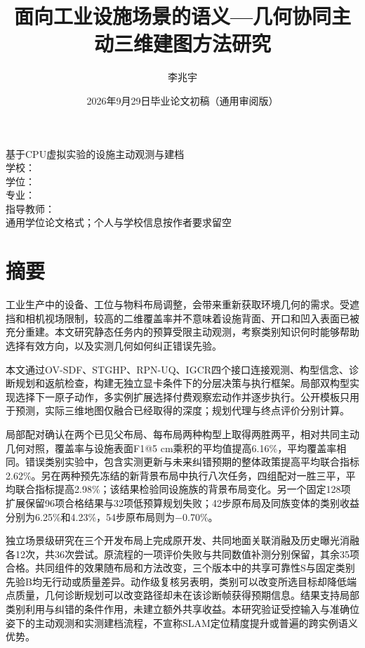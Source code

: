 \documentclass[11pt,a4paper]{article}
\title{\textbf{面向工业设施场景的语义---几何协同主动三维建图方法研究}}
\author{李兆宇}
\date{2026年9月29日\quad 毕业论文初稿（通用审阅版）}
\numberwithin{equation}{section}
\begin{document}
\hypersetup{pageanchor=false}
\begin{titlepage}
\maketitle\thispagestyle{empty}
\vfill\begin{center}基于CPU虚拟实验的设施主动观测与建档\\[1em]
学校：\underline{\hspace{55mm}}\\[1em]
学位：\underline{\hspace{55mm}}\\[1em]
专业：\underline{\hspace{55mm}}\\[1em]
指导教师：\underline{\hspace{48mm}}\\[2em]
通用学位论文格式；个人与学校信息按作者要求留空\end{center}
\end{titlepage}
\hypersetup{pageanchor=true}
\section*{摘要}
工业生产中的设备、工位与物料布局调整，会带来重新获取环境几何的需求。受遮挡和相机视场限制，较高的二维覆盖率并不意味着设施背面、开口和凹入表面已被充分重建。本文研究静态任务内的预算受限主动观测，考察类别知识何时能够帮助选择有效方向，以及实测几何如何纠正错误先验。

本文通过OV-SDF、STGHP、RPN-UQ、IGCR四个接口连接观测、构型信念、诊断规划和返航检查，构建无独立显卡条件下的分层决策与执行框架。局部双构型实现选择下一原子动作，多实例扩展选择付费观察宏动作并逐步执行。公开模板只用于预测，实际三维地图仅融合已经取得的深度；规划代理与终点评价分别计算。

局部配对确认在两个已见父布局、每布局两种构型上取得两胜两平，相对共同主动几何对照，覆盖率与设施表面F1@5 cm乘积的平均值提高6.16\%，平均覆盖率相同。错误类别实验中，包含实测更新与未来纠错预期的整体政策提高平均联合指标2.62\%。另在两种预先冻结的新背景布局中执行八次任务，四组配对一胜三平，平均联合指标提高2.98\%；该结果检验同设施族的背景布局变化。另一个固定128项扩展保留96项合格结果与32项低预算规划失败；42步原布局及同族变体的类别收益分别为6.25\%和4.23\%，54步原布局则为−0.70\%。

独立场景级研究在三个开发布局上完成原开发、共同地面关联消融及历史曝光消融各12次，共36次尝试。原流程的一项评价失败与共同数值补测分别保留，其余35项合格。共同组件的效果随布局和方法改变，三个版本中的共享可靠性S与固定类别先验B均无行动或质量差异。动作级复核另表明，类别可以改变所选目标却降低端点质量，几何诊断规划可以改变路径却未在该诊断帧获得预期信息。结果支持局部类别利用与纠错的条件作用，未建立额外共享收益。本研究验证受控输入与准确位姿下的主动观测和实测建档流程，不宣称SLAM定位精度提升或普遍的跨实例语义优势。
\end{document}
